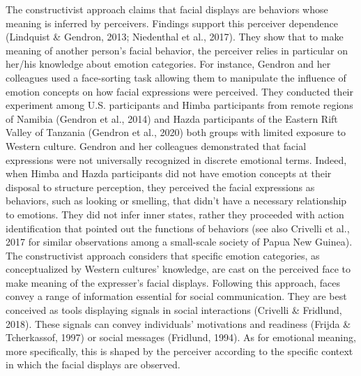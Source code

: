 \documentclass[
  english,
  man]{apa7}
\begin{document}
The constructivist approach claims that facial displays are behaviors whose meaning is inferred by perceivers. Findings support this perceiver dependence (Lindquist \& Gendron, 2013; Niedenthal et al., 2017). They show that to make meaning of another person's facial behavior, the perceiver relies in particular on her/his knowledge about emotion categories. For instance, Gendron and her colleagues used a face-sorting task allowing them to manipulate the influence of emotion concepts on how facial expressions were perceived. They conducted their experiment among U.S. participants and Himba participants from remote regions of Namibia (Gendron et al., 2014) and Hazda participants of the Eastern Rift Valley of Tanzania (Gendron et al., 2020) both groups with limited exposure to Western culture. Gendron and her colleagues demonstrated that facial expressions were not universally recognized in discrete emotional terms. Indeed, when Himba and Hazda participants did not have emotion concepts at their disposal to structure perception, they perceived the facial expressions as behaviors, such as looking or smelling, that didn't have a necessary relationship to emotions. They did not infer inner states, rather they proceeded with action identification that pointed out the functions of behaviors (see also Crivelli et al., 2017 for similar observations among a small-scale society of Papua New Guinea). The constructivist approach considers that specific emotion categories, as conceptualized by Western cultures' knowledge, are cast on the perceived face to make meaning of the expresser's facial displays. Following this approach, faces convey a range of information essential for social communication. They are best conceived as tools displaying signals in social interactions (Crivelli \& Fridlund, 2018). These signals can convey individuals' motivations and readiness (Frijda \& Tcherkassof, 1997) or social messages (Fridlund, 1994). As for emotional meaning, more specifically, this is shaped by the perceiver according to the specific context in which the facial displays are observed.
\end{document}
